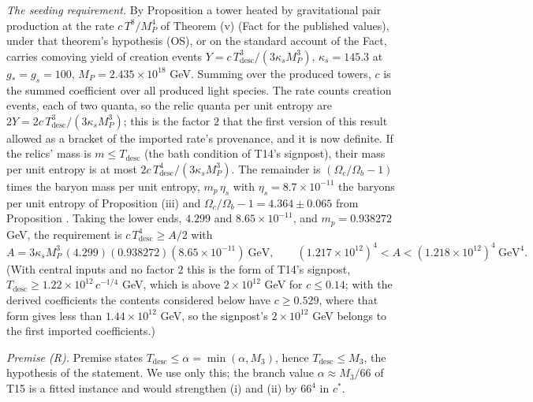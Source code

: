 \emph{The seeding requirement.} By Proposition  a tower heated by gravitational pair production at the rate $c\,T^{8}/M_{P}^{4}$ of Theorem (v) (Fact  for the published values), under that theorem's hypothesis (OS), or on the standard account of the Fact, carries comoving yield of creation events $Y = c\,T_{\mathrm{desc}}^{3}/(3\kappa_{s}M_{P}^{3})$, $\kappa_{s} = 145.3$ at $g_{*} = g_{s} = 100$, $M_{P} = 2.435 \times 10^{18}$ GeV. Summing over the produced towers, $c$ is the summed coefficient over all produced light species. The rate counts creation events, each of two quanta, so the relic quanta per unit entropy are $2Y = 2c\,T_{\mathrm{desc}}^{3}/(3\kappa_{s}M_{P}^{3})$; this is the factor $2$ that the first version of this result allowed as a bracket of the imported rate's provenance, and it is now definite. If the relics' mass is $m \le T_{\mathrm{desc}}$ (the bath condition of T14's signpost), their mass per unit entropy is at most $2c\,T_{\mathrm{desc}}^{4}/(3\kappa_{s}M_{P}^{3})$. The remainder is $(\Omega_{c}/\Omega_{b} - 1)$ times the baryon mass per unit entropy, $m_{p}\,\eta_{s}$ with $\eta_{s} = 8.7 \times 10^{-11}$ the baryons per unit entropy of Proposition (iii) and $\Omega_{c}/\Omega_{b} - 1 = 4.364 \pm 0.065$ from Proposition . Taking the lower ends, $4.299$ and $8.65 \times 10^{-11}$, and $m_{p} = 0.938272$ GeV, the requirement is $c\,T_{\mathrm{desc}}^{4} \ge A/2$ with
\[
A = 3\kappa_{s}M_{P}^{3}\,(4.299)(0.938272)(8.65 \times 10^{-11})\ \mathrm{GeV}, \qquad (1.217 \times 10^{12})^{4} < A < (1.218 \times 10^{12})^{4}\ \mathrm{GeV}^{4}.
\]
(With central inputs and no factor $2$ this is the form of T14's signpost, $T_{\mathrm{desc}} \ge 1.22 \times 10^{12}\,c^{-1/4}$ GeV, which is above $2 \times 10^{12}$ GeV for $c \le 0.14$; with the derived coefficients the contents considered below have $c \ge 0.529$, where that form gives less than $1.44 \times 10^{12}$ GeV, so the signpost's $2 \times 10^{12}$ GeV belongs to the first imported coefficients.)

\emph{Premise (R).} Premise  states $T_{\mathrm{desc}} \le \alpha = \min(\alpha, M_{3})$, hence $T_{\mathrm{desc}} \le M_{3}$, the hypothesis of the statement. We use only this; the branch value $\alpha \approx M_{3}/66$ of T15 is a fitted instance and would strengthen (i) and (ii) by $66^{4}$ in $c^{*}$.

